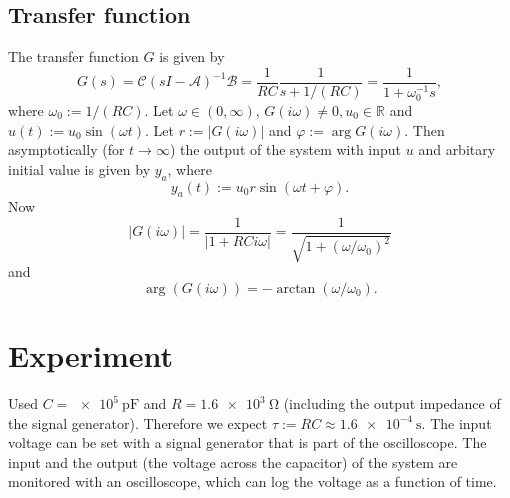 \documentclass[10pt, a4paper]{article} %
\begin{document}
\subsection{Transfer function}
The transfer function $G$ is given by
\begin{equation*}
	G(s) =  \mathcal{C} (sI -\mathcal{A})^{-1} \mathcal{B} = \frac{1}{RC}\frac{1}{s + 1/(RC)}
	=  \frac{1}{1+ \omega_0^{-1} s},
\end{equation*}
where $\omega_0 := 1/(RC)$.
Let
$\omega \in (0, \infty)$, $G(i\omega) \neq 0, u_0 \in \mathbb{R}$ and $u(t) := u_0 \sin (\omega t)$.
Let $r:= |G(i\omega) |$ and $\varphi := \arg G(i\omega )$.
Then asymptotically (for $t \to \infty$) the output of the system with input $u$ and arbitary initial value is given by $y_a$, where
\begin{equation*}
	y_a (t) := u_0 r \sin (\omega t+ \varphi).
\end{equation*}
Now
\begin{equation*}
	| G(i \omega) | =  \frac{1}{|1+ RC i\omega |} = \frac{1}{\sqrt{1 + (\omega / \omega_0)^2}}
\end{equation*}
and
\begin{equation*}
\arg (G(i\omega)) =  - \arctan (  \omega / \omega_0).
\end{equation*}
\section{Experiment}
Used $C = \SI{e5}{\pico \farad}$ and $R = \SI{1.6e3}{\ohm}$ (including the output impedance of the signal generator).
Therefore we expect $\tau := RC \approx \SI{1.6e-4}{\second}$.
The input voltage can be set with a signal generator that is part of the oscilloscope.
The input and the output (the voltage across the capacitor) of the system are monitored with an oscilloscope, which can log the voltage as a function of time.
\end{document}
